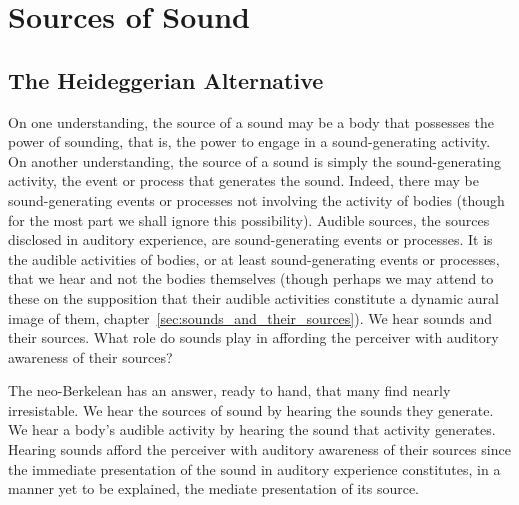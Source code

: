 \chapter{Sources of Sound} %
\label{cha:sources_of_sound}

\section{The Heideggerian Alternative} %
\label{sec:the_heideggerian_alternative}

On one understanding, the source of a sound may be a body that possesses the power of sounding, that is, the power to engage in a sound-generating activity. On another understanding, the source of a sound is simply the sound-generating activity, the event or process that generates the sound. Indeed, there may be sound-generating events or processes not involving the activity of bodies (though for the most part we shall ignore this possibility). Audible sources, the sources disclosed in auditory experience, are sound-generating events or processes. It is the audible activities of bodies, or at least sound-generating events or processes, that we hear and not the bodies themselves (though perhaps we may attend to these on the supposition that their audible activities constitute a dynamic aural image of them, chapter~\ref{sec:sounds_and_their_sources}). We hear sounds and their sources. What role do sounds play in affording the perceiver with auditory awareness of their sources?

The neo-Berkelean has an answer, ready to hand, that many find nearly irresistable. We hear the sources of sound by hearing the sounds they generate. We hear a body's audible activity by hearing the sound that activity generates. Hearing sounds afford the perceiver with auditory awareness of their sources since the immediate presentation of the sound in auditory experience constitutes, in a manner yet to be explained, the mediate presentation of its source.

